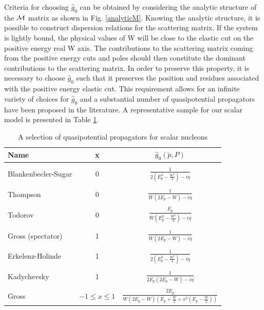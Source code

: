 \documentclass[mythesis.tex]{subfiles}
\begin{document}
Criteria for choosing $\hat g_0$ can be obtained by considering the analytic
structure of the $\cal M$ matrix as shown in Fig. \ref{analyticM}. Knowing
the analytic structure, it is possible to construct dispersion relations for
the scattering matrix. If the system is lightly bound, the physical values
of W will be close to the elastic cut on the positive energy
real W axis. The contributions to the scattering matrix coming from the
positive energy cuts and poles should then constitute the dominant
contributions to the scattering matrix. In order to preserve this property,
it is necessary to choose $\hat g_0$ such that it preserves the position
and residues associated with the positive energy elastic cut. This
requirement allows for an infinite variety of choices for $\hat g_0$ and
a substantial number of quasipotential propagators have been proposed in
the literature. A representative sample for our scalar model is presented
in Table \ref{quasitable}.
\begin{table}
\caption{A selection of quasipotential propagators for scalar nucleons}
\label{quasitable}
\vspace{12pt.}
\begin{center}
\begin{tabular}{lcc}\hline\hline
Name & x & $\hat g_0(\check p,P)$ \\
\hline
 & & \\
Blankenbecler-Sugar \cite{BSLT} & 0 & $\frac{1}{2(E^2_p-\frac{W^2}{4})-i\eta}$  \\
 & & \\
Thompson \cite{Thompson} & 0 & $\frac{1}{W(2E_p-W)-i\eta}$  \\
 & & \\
Todorov \cite{Todorov}  & 0 & $\frac{E_p}{W(E^2_p-\frac{W^2}{4})-i\eta}$ \\
 & & \\
Gross (spectator) \cite{GrossA} & 1 & $\frac{1}{W(2E_p-W)-i\eta}$  \\
 & & \\
Erkelenz-Holinde  \cite{Erkelenz} & 1 & $\frac{1}{2(E^2_p-\frac{W^2}{4})-i\eta}$  \\
 & & \\
Kadychevsky  \cite{Kadychevsky} & 1 &  $\frac{1}{2E_p(2E_p-W)-i\eta}$ \\
 & & \\
Gross  \cite{GrossB} & $-1\leq x\leq 1$ &$\frac{2E_p}{W(2E_p-W)(E_p+\frac{W}{2}+
        x^2(E_p-\frac{W}{2}))}$\\ \hline\hline
\end{tabular}
\end{center}
\end{table}
%
\end{document}
